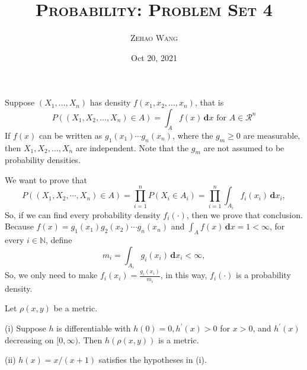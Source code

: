 \documentclass[en, normal, 11pt, black]{elegantnote}
\title{\textsc{Probability: Problem Set 4}}
\author{\textsc{Zehao Wang}}
\date{Oct 20, 2021}
\newenvironment{exercise}[1]{\begin{tcolorbox}[colback=black!15, colframe=black!80, breakable, title=#1]}{\end{tcolorbox}}
\renewenvironment{proof}{\begin{tcolorbox}[colback=white, colframe=black!50, breakable, title=Proof. ]\setlength{\parskip}{0.8em}}{\,\\\rightline{$\square$}\end{tcolorbox}}
\newcommand{\der}{\,\mathbf{d}}
\begin{document}
    \maketitle

    \begin{exercise}{2.1.1}
        Suppose $\left(X_{1}, \ldots, X_{n}\right)$ has density $f\left(x_{1}, x_{2}, \ldots, x_{n}\right)$, that is
        \[
        P\left(\left(X_{1}, X_{2}, \ldots, X_{n}\right) \in A\right)=\int_{A} f(x) \der x \text { for } A \in \mathcal{R}^{n}
        \]
        If $f(x)$ can be written as $g_{1}\left(x_{1}\right) \cdots g_{n}\left(x_{n}\right)$, where the $g_{m} \geqslant 0$ are measurable, then $X_{1}, X_{2}, \ldots, X_{n}$ are independent. Note that the $g_{m}$ are not assumed to be probability densities. 
    \end{exercise}

    \begin{proof}
        We want to prove that 
        \[
            P((X_1,X_2,\cdots,X_n)\in A)=\prod_{i=1}^nP(X_i\in A_i)=\prod_{i=1}^n\int_{A_i}f_i(x_i) \der x_i, 
        \]
        So, if we can find every probability density $f_i(\cdot)$, then we prove that conclusion. Because $f(x)=g_1(x_1)g_2(x_2)\cdots g_n(x_n)$ and $\int_Af(x)\der x=1<\infty$, for every $i\in \mathbb{N}$, define 
        \[
            m_i=\int_{A_i} g_i(x_i) \der x_i<\infty, 
        \]
        So, we only need to make $f_i(x_i)=\frac{g_i(x_i)}{m_i}$, in this way, $f_i(\cdot)$ is a probability density. 
    \end{proof}


    \begin{exercise}{2.1.3}
        Let $\rho(x, y)$ be a metric. 
        
        (i) Suppose $h$ is differentiable with $h(0)=0, h^{\prime}(x)>0$ for $x>0$, and $h^{\prime}(x)$ decreasing on $[0, \infty)$. Then $h(\rho(x, y))$ is a metric. 
        
        (ii) $h(x)=x /(x+1)$ satisfies the hypotheses in (i). 
    \end{exercise}
\end{document}
